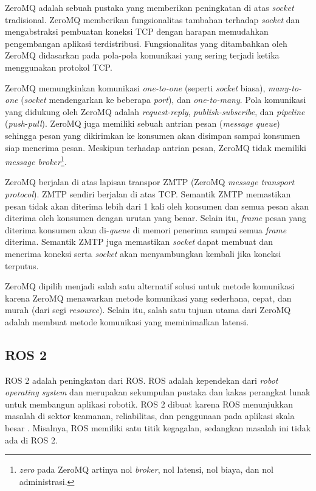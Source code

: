 ZeroMQ adalah sebuah pustaka yang memberikan pe\-ning\-ka\-tan di atas
\textit{socket} tradisional. ZeroMQ memberikan fungsionalitas tambahan terhadap
\textit{socket} dan mengabstraksi pembuatan koneksi TCP dengan harapan
memudahkan pengembangan aplikasi terdistribusi. Fungsionalitas yang ditambahkan
oleh ZeroMQ didasarkan pada pola-pola komunikasi yang sering terjadi ketika
menggunakan protokol TCP.

ZeroMQ memungkinkan komunikasi \textit{one-to-one} (seperti \textit{socket}
biasa), \textit{many-to-one} (\textit{socket} mendengarkan ke beberapa
\textit{port}), dan \textit{one-to-many}. Pola komunikasi yang didukung oleh
ZeroMQ adalah \textit{request-reply}, \textit{publish-subscribe}, dan
\textit{pipeline} (\textit{push}-\textit{pull}). ZeroMQ juga memiliki sebuah
antrian pesan (\textit{message queue}) sehingga pesan yang dikirimkan ke
konsumen akan disimpan sampai konsumen siap menerima pesan. Meskipun terhadap
antrian pesan, ZeroMQ tidak memiliki \textit{message
	broker}\footnote{\textit{zero} pada ZeroMQ artinya nol \textit{broker}, nol
	latensi, nol biaya, dan nol administrasi.}.

ZeroMQ berjalan di atas lapisan transpor ZMTP (ZeroMQ \textit{message transport
	protocol}). ZMTP sendiri berjalan di atas TCP. Semantik ZMTP memastikan
pesan tidak akan diterima lebih dari 1 kali oleh konsumen dan semua pesan
akan diterima oleh konsumen dengan urutan yang benar. Selain itu,
\textit{frame} pesan yang diterima konsumen akan di-\textit{queue} di memori
penerima sampai semua \textit{frame} diterima. Semantik ZMTP juga memastikan
\textit{socket} dapat membuat dan menerima koneksi serta \textit{socket}
akan menyambungkan kembali jika koneksi terputus.

ZeroMQ dipilih menjadi salah satu alternatif solusi untuk metode komunikasi
karena ZeroMQ menawarkan metode komunikasi yang sederhana, cepat, dan murah
(dari segi \textit{resource}). Selain itu, salah satu tujuan utama dari ZeroMQ
adalah membuat metode komunikasi yang meminimalkan latensi.

\subsection{ROS 2}

ROS 2 adalah peningkatan dari ROS. ROS adalah kependekan dari \textit{robot
	operating system} dan merupakan sekumpulan pustaka dan kakas perangkat lunak
untuk membangun aplikasi robotik. ROS 2 dibuat karena ROS menunjukkan masalah di
sektor keamanan, reliabilitas, dan penggunaan pada aplikasi skala besar
\parencite{doi:10.1126/scirobotics.abm6074_ros}. Misalnya, ROS memiliki satu
titik kegagalan, sedangkan masalah ini tidak ada di ROS 2.

